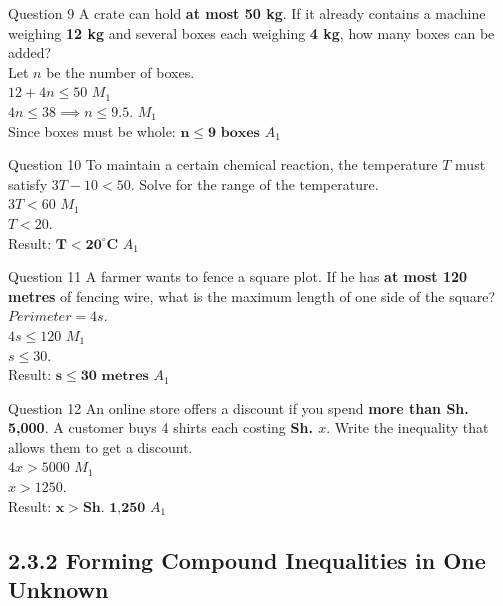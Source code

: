 \documentclass[12pt, a4paper, oneside]{article}
\begin{document}
\begin{solvingbox}{Question 9}
A crate can hold \textbf{at most 50 kg}. If it already contains a machine weighing \textbf{12 kg} and several boxes each weighing \textbf{4 kg}, how many boxes can be added? \\
Let $n$ be the number of boxes. \\
$12 + 4n \leq 50$ \hfill $M_1$ \\
$4n \leq 38 \implies n \leq 9.5$. \hfill $M_1$ \\
Since boxes must be whole: $\mathbf{n \leq 9 \text{ boxes}}$ \hfill $A_1$
\end{solvingbox}

\begin{solvingbox}{Question 10}
To maintain a certain chemical reaction, the temperature $T$ must satisfy $3T - 10 < 50$. Solve for the range of the temperature. \\
$3T < 60$ \hfill $M_1$ \\
$T < 20$. \\
Result: $\mathbf{T < 20^\circ \text{C}}$ \hfill $A_1$
\end{solvingbox}

\begin{solvingbox}{Question 11}
A farmer wants to fence a square plot. If he has \textbf{at most 120 metres} of fencing wire, what is the maximum length of one side of the square? \\
$Perimeter = 4s$. \\
$4s \leq 120$ \hfill $M_1$ \\
$s \leq 30$. \\
Result: $\mathbf{s \leq 30 \text{ metres}}$ \hfill $A_1$
\end{solvingbox}

\begin{solvingbox}{Question 12}
An online store offers a discount if you spend \textbf{more than Sh. 5,000}. A customer buys 4 shirts each costing \textbf{Sh. $x$}. Write the inequality that allows them to get a discount. \\
$4x > 5000$ \hfill $M_1$ \\
$x > 1250$. \\
Result: $\mathbf{x > \text{Sh. 1,250}}$ \hfill $A_1$
\end{solvingbox}

\newpage
\subsection*{2.3.2 Forming Compound Inequalities in One Unknown}
\end{document}
